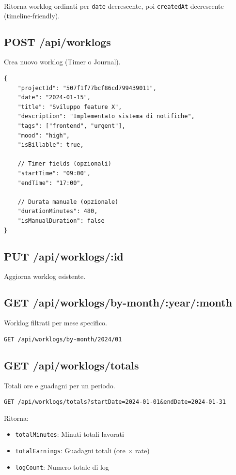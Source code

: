 \documentclass[11pt,a4paper]{article}
\begin{document}
Ritorna worklog ordinati per \texttt{date} decrescente, poi \texttt{createdAt} decrescente (timeline-friendly).

\subsection{POST /api/worklogs}

Crea nuovo worklog (Timer o Journal).

\begin{lstlisting}[caption=Request Body]
{
    "projectId": "507f1f77bcf86cd799439011",
    "date": "2024-01-15",
    "title": "Sviluppo feature X",
    "description": "Implementato sistema di notifiche",
    "tags": ["frontend", "urgent"],
    "mood": "high",
    "isBillable": true,
    
    // Timer fields (opzionali)
    "startTime": "09:00",
    "endTime": "17:00",
    
    // Durata manuale (opzionale)
    "durationMinutes": 480,
    "isManualDuration": false
}
\end{lstlisting}

\subsection{PUT /api/worklogs/:id}

Aggiorna worklog esistente.

\subsection{GET /api/worklogs/by-month/:year/:month}

Worklog filtrati per mese specifico.

\begin{lstlisting}[caption=Esempio]
GET /api/worklogs/by-month/2024/01
\end{lstlisting}

\subsection{GET /api/worklogs/totals}

Totali ore e guadagni per un periodo.

\begin{lstlisting}[caption=Query Parameters]
GET /api/worklogs/totals?startDate=2024-01-01&endDate=2024-01-31
\end{lstlisting}

Ritorna:
\begin{itemize}
    \item \texttt{totalMinutes}: Minuti totali lavorati
    \item \texttt{totalEarnings}: Guadagni totali (ore × rate)
    \item \texttt{logCount}: Numero totale di log
\end{itemize}
\end{document}
